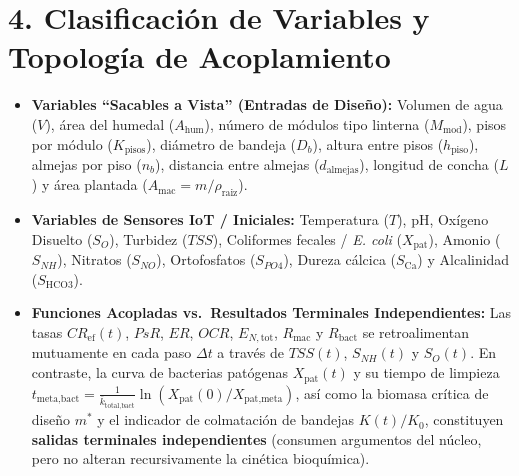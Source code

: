 \documentclass[11pt,letterpaper]{article}
\begin{document}
\section*{4. Clasificación de Variables y Topología de Acoplamiento}
\begin{itemize}[leftmargin=1.5em,noitemsep]
    \item \textbf{Variables ``Sacables a Vista'' (Entradas de Diseño):} Volumen de agua ($V$), área del humedal ($A_{\text{hum}}$), número de módulos tipo linterna ($M_{\text{mod}}$), pisos por módulo ($K_{\text{pisos}}$), diámetro de bandeja ($D_b$), altura entre pisos ($h_{\text{piso}}$), almejas por piso ($n_b$), distancia entre almejas ($d_{\text{almejas}}$), longitud de concha ($L$) y área plantada ($A_{\text{mac}} = m/\rho_{\text{raiz}}$).
    \item \textbf{Variables de Sensores IoT / Iniciales:} Temperatura ($T$), $\text{pH}$, Oxígeno Disuelto ($S_O$), Turbidez ($TSS$), Coliformes fecales / \textit{E. coli} ($X_{\text{pat}}$), Amonio ($S_{NH}$), Nitratos ($S_{NO}$), Ortofosfatos ($S_{PO4}$), Dureza cálcica ($S_{\text{Ca}}$) y Alcalinidad ($S_{\text{HCO3}}$).
    \item \textbf{Funciones Acopladas vs.\ Resultados Terminales Independientes:} Las tasas $CR_{\text{ef}}(t)$, $PsR$, $ER$, $OCR$, $E_{N,\text{tot}}$, $R_{\text{mac}}$ y $R_{\text{bact}}$ se retroalimentan mutuamente en cada paso $\Delta t$ a través de $TSS(t)$, $S_{NH}(t)$ y $S_O(t)$. En contraste, la curva de bacterias patógenas $X_{\text{pat}}(t)$ y su tiempo de limpieza $t_{\text{meta,bact}} = \frac{1}{\overline{k}_{\text{total,bact}}}\ln(X_{\text{pat}}(0)/X_{\text{pat,meta}})$, así como la biomasa crítica de diseño $m^*$ y el indicador de colmatación de bandejas $K(t)/K_0$, constituyen \textbf{salidas terminales independientes} (consumen argumentos del núcleo, pero no alteran recursivamente la cinética bioquímica).
\end{itemize}
\end{document}
